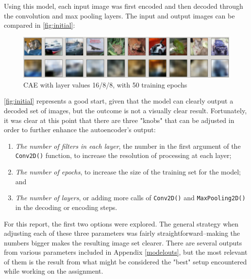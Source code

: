 \documentclass{article}
\begin{document}
\par Using this model, each input image was first encoded and then decoded through the convolution and max pooling layers.
The input and output images can be compared in \autoref{fig:initial}:

\begin{figure}[H]
    \centering
    \includegraphics[width=5in]{csci-8110/hw-1/hw1-images/16-8-8-50.png}
    \caption{CAE with layer values 16/8/8, with 50 training epochs}
    \label{fig:initial}
\end{figure}

\par \autoref{fig:initial} represents a good start, given that the model can clearly output a decoded set of images, but the outcome is not a visually clear result. 
Fortunately, it was clear at this point that there are three "knobs" that can be adjusted in order to further enhance the autoencoder's output:
\begin{enumerate}
  \item \textit{The number of filters in each layer}, the number in the first argument of the \lstinline[language=Python]{Conv2D()} function, to increase the resolution  of processing at each layer;
  \item \textit{The number of epochs}, to increase the size of the training set for the model; and
  \item \textit{The number of layers}, or adding more calls of \lstinline[language=Python]{Conv2D()} and \lstinline[language=Python]{MaxPooling2D()} in the decoding or encoding steps.
\end{enumerate}

\par For this report, the first two options were explored. 
The general strategy when adjusting each of these three parameters was fairly straightforward--making the numbers bigger makes the resulting image set clearer.
There are several outputs from various parameters included in Appendix \ref{modelouts}, but the most relevant of them is the result from what might be considered the "best" setup encountered while working on the assignment.
\end{document}
